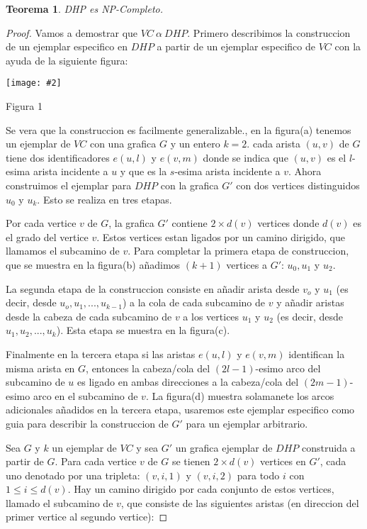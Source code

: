 \documentclass{article}
\newtheorem{theorem}{Teorema}
\newcommand{\jcimage}[2]{\begin{center}\texttt{[image: \#2]}\end{center}\vskip10pt}
\begin{document}
\begin{theorem}
  DHP es NP-Completo.
\end{theorem}
\begin{proof}
  Vamos a demostrar que $VC\ \alpha\ DHP$. Primero describimos la construccion de un ejemplar especifico en $DHP$ a partir de un ejemplar especifico de $VC$ con la ayuda de la siguiente figura:

  \jcimage{0.7}{figura-dhp.jpg}{Figura 1}

  Se vera que la construccion es facilmente generalizable., en la figura(a) tenemos un ejemplar de $VC$ con una grafica $G$ y un entero $k = 2$. cada arista $(u,v)$ de $G$ tiene dos identificadores $e(u,l)$ y $e(v,m)$ donde se indica que $(u,v)$ es el $l$-esima arista incidente a $u$ y que es la $s$-esima arista incidente a $v$. Ahora construimos el ejemplar para $DHP$ con la grafica $G'$ con dos vertices distinguidos $u_0$ y $u_k$. Esto se realiza en tres etapas.

  Por cada vertice $v$ de $G$, la grafica $G'$ contiene $2 \times d(v)$ vertices donde $d(v)$ es el grado del vertice $v$. Estos vertices estan ligados por un camino dirigido, que llamamos el subcamino de $v$. Para completar la primera etapa de construccion, que se muestra en la figura(b) añadimos $(k + 1)$ vertices a $G'$: $u_0, u_1$ y $u_2$.

  La segunda etapa de la construccion consiste en añadir arista desde $v_o$ y $u_1$ (es decir, desde $u_o,u_1, ..., u_{k-1}$) a la cola de cada subcamino de $v$ y añadir aristas desde la cabeza de cada subcamino de $v$ a los vertices $u_1$ y $u_2$ (es decir, desde $u_1,u_2, ..., u_k$). Esta etapa se muestra en la figura(c).

  Finalmente en la tercera etapa si las aristas $e(u,l)$ y $e(v,m)$ identifican la misma arista en $G$, entonces la cabeza/cola del $(2l-1)$-esimo arco del subcamino de $u$ es ligado en ambas direcciones a la cabeza/cola  del $(2m-1)$-esimo arco en el subcamino de $v$. La figura(d) muestra solamanete los arcos adicionales añadidos en la tercera etapa, usaremos este ejemplar especifico como guia para describir la construccion de $G'$ para un ejemplar arbitrario.

  Sea $G$ y $k$ un ejemplar de $VC$ y sea $G'$ un grafica ejemplar de $DHP$ construida a partir de $G$. Para cada vertice $v$ de $G$ se tienen $2 \times d(v)$ vertices en $G'$, cada uno denotado por una tripleta: $(v, i, 1)$ y $(v, i, 2)$ para todo $i$ con $1 \leqslant i \leqslant d(v)$. Hay un camino dirigido por cada conjunto de estos vertices, llamado el subcamino de $v$, que consiste de las siguientes aristas (en direccion del primer vertice al segundo vertice):


\end{proof}
\end{document}
